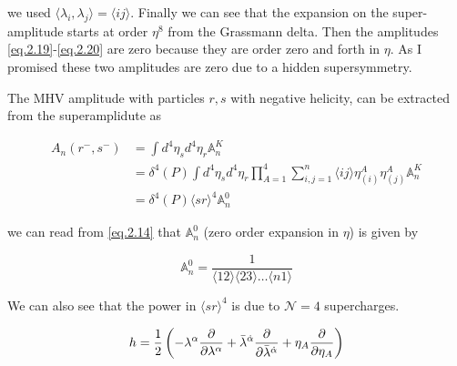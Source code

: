 we used $\langle\lambda_{i},\lambda_{j}\rangle = \langle ij \rangle$. Finally we can see that the expansion on the super-amplitude starts at order $\eta^{8}$ from the  Grassmann delta. Then the amplitudes \eqref{eq.2.19}-\eqref{eq.2.20} are zero because they are order zero and forth in $\eta$. As I promised these two amplitudes are zero due to a hidden supersymmetry. 


The MHV amplitude with particles $r,s$ with negative helicity, can be extracted from the superamplidute as 


\begin{align}
A_{n}(r^{-},s^{-}) &= \int d^{4}\eta_{s}d^{4}\eta_{r} \mathbb{A}_{n}^{K}  \\ \nonumber  &= \delta^{4}(P)\int d^{4}\eta_{s}d^{4}\eta_{r} \prod_{A=1}^{4} \sum_{i,j=1}^{n}\langle ij \rangle \eta^{A}_{(i)}\eta^{A}_{(j)}\mathbb{A}_{n}^{K} \\ \nonumber
&= \delta^{4}(P) \langle sr \rangle^{4}\mathbb{A}_{n}^{0}
\end{align}

we can read from \eqref{eq.2.14} that $\mathbb{A}_{n}^{0}$ (zero order expansion in $\eta$) is given by 

\begin{equation}
\mathbb{A}_{n}^{0} = \frac{1}{\langle 12\rangle \langle 23\rangle \dots \langle n1\rangle }
\end{equation}


We can also see that the power in $ \langle sr \rangle^{4}$ is due to $\mathcal{N} = 4$ supercharges.











\begin{equation}
h = \frac{1}{2}\left( -\lambda^{\alpha}\frac{\partial}{\partial\lambda^{\alpha}} + \bar{\lambda}^{\dot{\alpha}}\frac{\partial}{\partial\bar{\lambda}^{\dot{\alpha}}} + \eta_{A}\frac{\partial}{\partial\eta_{A}} \right)
\end{equation}




























 
